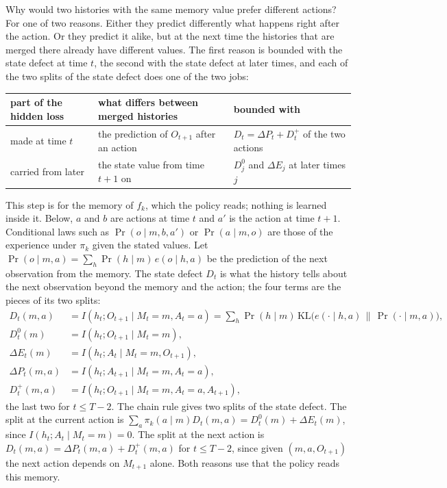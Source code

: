 \documentclass[11pt]{article}
\theoremstyle{definition}
\newcommand{\KL}{\mathrm{KL}}
\newcommand{\dE}{\Delta E}
\newcommand{\dP}{\Delta P}
\begin{document}
Why would two histories with the same memory value prefer different actions? For one of two reasons. Either they predict differently what happens right after the action. Or they predict it alike, but at the next time the histories that are merged there already have different values. The first reason is bounded with the state defect at time $t$, the second with the state defect at later times, and each of the two splits of the state defect does one of the two jobs:
\begin{center}
\small
\begin{tabular}{lll}
\hline
part of the hidden loss & what differs between merged histories & bounded with\\
\hline
made at time $t$ & the prediction of $O_{t+1}$ after an action & $D_t=\dP_t+D^+_t$ of the two actions\\
carried from later & the state value from time $t+1$ on & $D^0_j$ and $\dE_j$ at later times $j$\\
\hline
\end{tabular}
\end{center}
This step is for the memory of $f_k$, which the policy reads; nothing is learned inside it. Below, $a$ and $b$ are actions at time $t$ and $a'$ is the action at time $t+1$. Conditional laws such as $\Pr(o\mid m,b,a')$ or $\Pr(a\mid m,o)$ are those of the experience under $\pi_k$ given the stated values. Let $\Pr(o\mid m,a)=\sum_h\Pr(h\mid m)\,e(o\mid h,a)$ be the prediction of the next observation from the memory. The state defect $D_t$ is what the history tells about the next observation beyond the memory and the action; the four terms are the pieces of its two splits:
\begin{align*}
D_t(m,a)&=I(h_t;O_{t+1}\mid M_t=m,A_t=a)=\sum_h\Pr(h\mid m)\,\KL\big(e(\cdot\mid h,a)\,\big\|\,\Pr(\cdot\mid m,a)\big),\\
D^0_t(m)&=I(h_t;O_{t+1}\mid M_t=m),\\
\dE_t(m)&=I(h_t;A_t\mid M_t=m,O_{t+1}),\\
\dP_t(m,a)&=I(h_t;A_{t+1}\mid M_t=m,A_t=a),\\
D^+_t(m,a)&=I(h_t;O_{t+1}\mid M_t=m,A_t=a,A_{t+1}),
\end{align*}
the last two for $t\le T-2$. The chain rule gives two splits of the state defect. The split at the current action is $\sum_a\pi_k(a\mid m)D_t(m,a)=D^0_t(m)+\dE_t(m)$, since $I(h_t;A_t\mid M_t=m)=0$. The split at the next action is $D_t(m,a)=\dP_t(m,a)+D^+_t(m,a)$ for $t\le T-2$, since given $(m,a,O_{t+1})$ the next action depends on $M_{t+1}$ alone. Both reasons use that the policy reads this memory.
\end{document}
